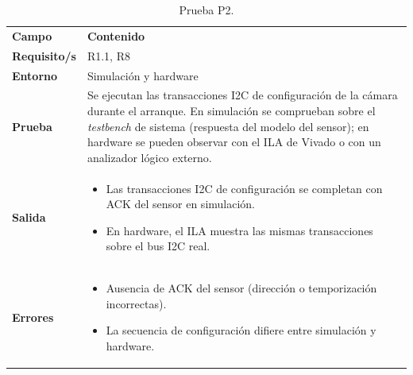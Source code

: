 \documentclass[../main.tex]{subfiles}
\begin{document}
\begin{table}[H]
\centering
\caption{Prueba P2.}
\label{tab:prueba_p2}
\begin{tabular}{>{\raggedright\arraybackslash}p{2.5cm}>{\raggedright\arraybackslash}p{11cm}}
\rowcolor[HTML]{156082}
{\color{white}\textbf{Campo}} & {\color{white}\textbf{Contenido}} \\
\rowcolor[HTML]{C0E6F5}
\textbf{Requisito/s} & R1.1, R8 \\
\textbf{Entorno} & Simulación y hardware \\
\rowcolor[HTML]{C0E6F5}
\textbf{Prueba} & Se ejecutan las transacciones I2C de configuración de la cámara durante el arranque. En simulación se comprueban sobre el \emph{testbench} de sistema (respuesta del modelo del sensor); en hardware se pueden observar con el ILA de Vivado o con un analizador lógico externo. \\
\textbf{Salida} & \begin{itemize}\setlength{\itemsep}{0pt}
    \item Las transacciones I2C de configuración se completan con ACK del sensor en simulación.
    \item En hardware, el ILA muestra las mismas transacciones sobre el bus I2C real.
\end{itemize} \\
\rowcolor[HTML]{C0E6F5}
\textbf{Errores} & \begin{itemize}\setlength{\itemsep}{0pt}
    \item Ausencia de ACK del sensor (dirección o temporización incorrectas).
    \item La secuencia de configuración difiere entre simulación y hardware.
\end{itemize} \\
\end{tabular}
\end{table}
\end{document}
